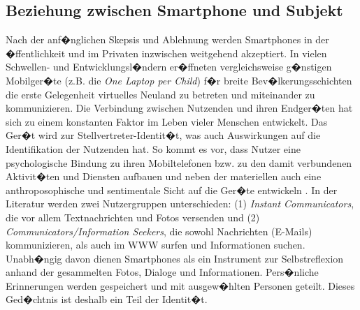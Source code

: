 \subsection{Beziehung zwischen Smartphone und Subjekt}
Nach der anf�nglichen Skepsis und Ablehnung werden Smartphones in der �ffentlichkeit und im Privaten inzwischen weitgehend akzeptiert. In vielen Schwellen- und Entwicklungsl�ndern er�ffneten vergleichsweise g�nstigen Mobilger�te (z.B. die \textit{One Laptop per Child}) f�r breite Bev�lkerungsschichten die erste Gelegenheit virtuelles Neuland zu betreten und miteinander zu kommunizieren. Die Verbindung zwischen Nutzenden und ihren Endger�ten hat sich zu einem konstanten Faktor im Leben vieler Menschen entwickelt. Das Ger�t wird zur Stellvertreter-Identit�t, was auch Auswirkungen auf die Identifikation der Nutzenden hat. So kommt es vor, dass Nutzer eine psychologische Bindung zu ihren Mobiltelefonen bzw. zu den damit verbundenen Aktivit�ten und Diensten aufbauen und neben der materiellen auch eine anthroposophische und sentimentale Sicht auf die Ger�te entwickeln \cite{Fullwood2017}. In der Literatur werden zwei Nutzergruppen unterschieden: (1) \textit{Instant Communicators}, die vor allem Textnachrichten und Fotos versenden und (2) \textit{Communicators/Information Seekers}, die sowohl Nachrichten (E-Mails) kommunizieren, als auch im WWW surfen und Informationen suchen. 
Unabh�ngig davon dienen Smartphones als ein Instrument zur Selbstreflexion anhand der gesammelten Fotos, Dialoge und Informationen. Pers�nliche Erinnerungen werden gespeichert und mit ausgew�hlten Personen geteilt. Dieses Ged�chtnis ist deshalb ein Teil der Identit�t. 
 
 

\begin{comment}
yyy Paper weiter lesen: \cite{Fullwood2017}

ist ein Ger�t zum Speichern pers�nlicher Erinnerungen, wodurch man sich selbst auch reflektiert. %



Das Smartphone kann Aspekte der sozialen Identit�t sowie die Zugeh�rigkeit zu einer Gruppe repr�sentieren. Der Besitz eines Mobiltelefons und das Antwortzeiten 
 
phones express aspects of our social identities, or the extent to which we define ourselves by our membership to specific groups. Having a phone and speed of response is part of a group norm. 

Smartphone als Statussymbol ... der Typ von Telefon und die Art der Benutzung ist Teil der Identit�t der Nutzer

..sprechen dem Ger�t menschliche Qualit�ten und Charakteristiken zu 

.. �berlebenswichtig

.. notifikations: 'It's like it's crying for you'

.. starke emotionale Bindung: 

Nutzngsformen:
- funktional: 
- informational:
\end{comment}

